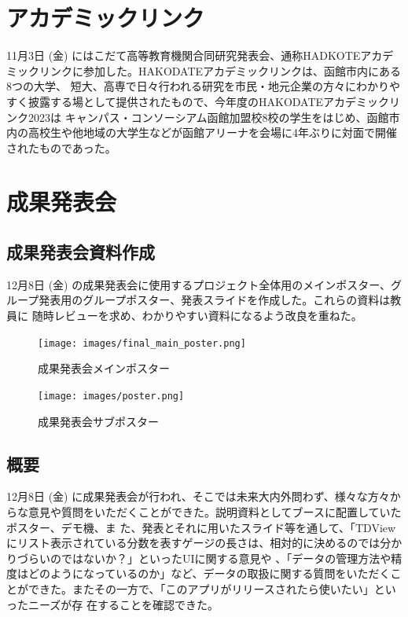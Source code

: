 \section{アカデミックリンク}
11月3日 (金) にはこだて高等教育機関合同研究発表会、通称HADKOTEアカデミックリンクに参加した。HAKODATEアカデミックリンクは、函館市内にある8つの大学、
短大、高専で日々行われる研究を市民・地元企業の方々にわかりやすく披露する場として提供されたもので、今年度のHAKODATEアカデミックリンク2023は
キャンパス・コンソーシアム函館加盟校8校の学生をはじめ、函館市内の高校生や他地域の大学生などが函館アリーナを会場に4年ぶりに対面で開催されたものであった。

\section{成果発表会}
\subsection{成果発表会資料作成}
12月8日 (金) の成果発表会に使用するプロジェクト全体用のメインポスター、グループ発表用のグループポスター、発表スライドを作成した。これらの資料は教員に
随時レビューを求め、わかりやすい資料になるよう改良を重ねた。

\begin{figure}[htbp]
    \centering
    \texttt{[image: images/final\_main\_poster.png]}
    \caption{成果発表会メインポスター}
    \label{fig:final_main_poster}
\end{figure}

\begin{figure}[htbp]
    \centering
    \texttt{[image: images/poster.png]}
    \caption{成果発表会サブポスター}
    \label{fig:poster}
\end{figure}
\pagebreak
{}

\subsection{概要}
12月8日 (金) に成果発表会が行われ、そこでは未来大内外問わず、様々な方々からな意見や質問をいただくことができた。説明資料としてブースに配置していたポスター、デモ機、ま
た、発表とそれに用いたスライド等を通して、「TDViewにリスト表示されている分数を表すゲージの長さは、相対的に決めるのでは分かりづらいのではないか？」といったUIに関する意見や
、「データの管理方法や精度はどのようになっているのか」など、データの取扱に関する質問をいただくことができた。またその一方で、「このアプリがリリースされたら使いたい」といったニーズが存
在することを確認できた。

